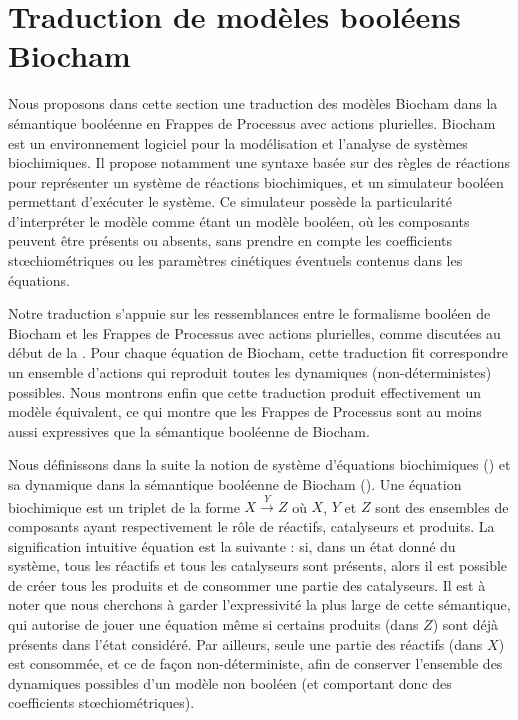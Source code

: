 
\section{Traduction de modèles booléens Biocham}

Nous proposons dans cette section une traduction des modèles Biocham dans la sémantique booléenne
en Frappes de Processus avec actions plurielles.
Biocham 
est un environnement logiciel pour la modélisation et l'analyse de systèmes biochimiques.
Il propose notamment une syntaxe basée sur des règles de réactions pour représenter
un système de réactions biochimiques,
et un simulateur booléen permettant d'exécuter le système.
Ce simulateur possède la particularité d'interpréter le modèle comme étant un modèle booléen,
où les composants peuvent être présents ou absents,
sans prendre en compte les coefficients stœchiométriques ou les paramètres cinétiques
éventuels contenus dans les équations.

Notre traduction s'appuie sur les ressemblances entre le formalisme booléen de Biocham
et les Frappes de Processus avec actions plurielles, comme discutées au début de la
.
Pour chaque équation de Biocham, cette traduction fit correspondre
un ensemble d'actions qui reproduit toutes les dynamiques (non-déterministes) possibles.
Nous montrons enfin que cette traduction produit effectivement un modèle équivalent,
ce qui montre que les Frappes de Processus sont au moins aussi expressives
que la sémantique booléenne de Biocham.

\myskip

Nous définissons dans la suite la notion de système d'équations biochimiques ()
et sa dynamique dans la sémantique booléenne de Biocham ().
Une équation biochimique est un triplet de la forme $X \xrightarrow{Y} Z$
où $X$, $Y$ et $Z$ sont des ensembles de composants ayant respectivement le rôle
de réactifs, catalyseurs et produits.
La signification intuitive équation est la suivante :
si, dans un état donné du système, tous les réactifs et tous les catalyseurs sont présents,
alors il est possible de créer tous les produits et de consommer une partie des catalyseurs.
Il est à noter que nous cherchons à garder l'expressivité la plus large de cette sémantique,
qui autorise de jouer une équation même si certains produits (dans $Z$) sont déjà présents
dans l'état considéré.
Par ailleurs, seule une partie des réactifs (dans $X$) est consommée, et ce de façon
non-déterministe, afin de conserver l'ensemble des dynamiques possibles d'un modèle non booléen
(et comportant donc des coefficients stœchiométriques).

